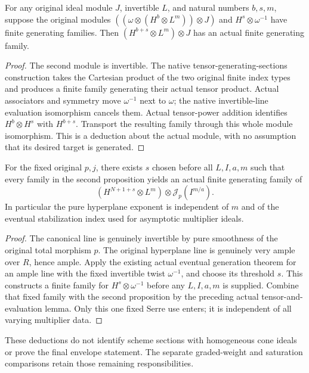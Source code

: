 \begin{lemma}
\label{lem:c0n-remove-canonical-buffer}
\leanok
For any original ideal module $J$, invertible $L$, and natural numbers
$b,s,m$, suppose the original modules
$((\omega\otimes(H^b\otimes L^m))\otimes J)$ and
$H^s\otimes\omega^{-1}$ have finite generating families.
Then $(H^{b+s}\otimes L^m)\otimes J$ has an actual finite generating
family.
\end{lemma}
\begin{proof}
The second module is invertible.  The native tensor-generating-sections
construction takes the Cartesian product of the two original finite
index types and produces a finite family generating their actual tensor
product.  Actual associators and symmetry move $\omega^{-1}$ next to
$\omega$; the native invertible-line evaluation isomorphism cancels
them.  Actual tensor-power addition identifies $H^b\otimes H^s$ with
$H^{b+s}$.  Transport the resulting family through this whole module
isomorphism.  This is a deduction about the actual module, with no
assumption that its desired target is generated.
\end{proof}

\begin{proposition}
\label{prop:c0n-uniform-pure-hyperplane-generators}
\leanok
For the fixed original $p,j$, there exists $s$ chosen before all $L,I,a,m$
such that every family in the second proposition yields an actual finite
generating family of
\[
 (H^{N+1+s}\otimes L^m)\otimes\mathcal J_p(I^{m/a}).
\]
In particular the pure hyperplane exponent is independent of $m$ and of
the eventual stabilization index used for asymptotic multiplier ideals.
\end{proposition}
\begin{proof}
The canonical line is genuinely invertible by pure smoothness of the
original total morphism $p$.  The original hyperplane line is genuinely
very ample over $R$, hence ample.  Apply the existing actual eventual
generation theorem for an ample line with the fixed invertible twist
$\omega^{-1}$, and choose its threshold $s$.  This constructs a finite
family for $H^s\otimes\omega^{-1}$ before any $L,I,a,m$ is supplied.
Combine that fixed family with the second proposition by the preceding
actual tensor-and-evaluation lemma.  Only this one fixed Serre use enters;
it is independent of all varying multiplier data.
\end{proof}

These deductions do not identify scheme sections with homogeneous cone
ideals or prove the final envelope statement.  The separate graded-weight
and saturation comparisons retain those remaining responsibilities.
